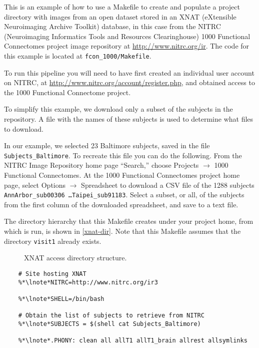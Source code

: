 \label{chap:XNAT}

This is an example of how to use a Makefile to create and populate a
project directory with images from an open dataset stored in an XNAT
(eXtensible Neuroimaging Archive Toolkit) database, in this case from
the NITRC (Neuroimaging Informatics Tools and Resources Clearinghouse)
1000 Functional Connectomes project image repository at
\url{http://www.nitrc.org/ir}. The code for this example is located at \texttt{fcon_1000/Makefile}.

To run this pipeline you will need to have first created an individual
user account on NITRC, at
\url{http://www.nitrc.org/account/register.php}, and obtained access
to the 1000 Functional Connectome project.

To simplify this example, we download only a subset of the subjects in
the repository. A file with the names of these subjects is used to
determine what files to download.

In our example, we selected 23 Baltimore subjects, saved in the file \texttt{Subjects_Baltimore}.
To recreate this file you can do the following. From the NITRC Image Repository home page ``Search,'' choose Projects $\rightarrow$ 1000 Functional Connectomes. At the 1000 Functional Connectomes project home page, select Options $\rightarrow$ Spreadsheet to download a CSV file of the 1288 subjects \texttt{AnnArbor_sub00306 \ldots Taipei_sub91183}. Select a subset, or all, of the subjects from the first column of the downloaded spreadsheet, and save to a text file. 

The directory hierarchy that this Makefile creates under your project
home, from which \maken{} is run, is shown in \autoref{xnat-dir}. Note
that this Makefile assumes that the directory \texttt{visit1} 
already exists.

\begin{figure}
	\caption{XNAT access directory structure.}
	\label{xnat-dir}
\end{figure}


\begin{lstlisting}
	# Site hosting XNAT
	%*\lnote*NITRC=http://www.nitrc.org/ir3
	
	%*\lnote*SHELL=/bin/bash
	
	# Obtain the list of subjects to retrieve from NITRC
	%*\lnote*SUBJECTS = $(shell cat Subjects_Baltimore)

	%*\lnote*.PHONY: clean all allT1 allT1_brain allrest allsymlinks
\end{lstlisting}

